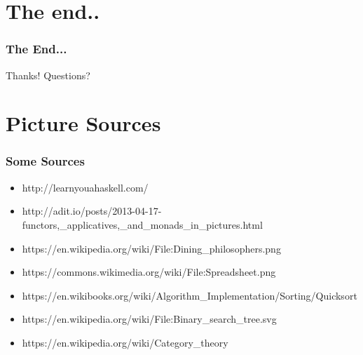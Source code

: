 \documentclass[12pt, xcolor=table]{beamer}
\begin{document}
\section{The end..} %
\begin{frame}
    \frametitle{The End...}
    \begin{block}{Thanks!}
        Questions?
    \end{block}
\end{frame}

\section{Picture Sources}
\begin{frame}
    \frametitle{Some Sources}
    \begin{itemize}
        \item \tiny{http://learnyouahaskell.com/}
        \item \tiny{http://adit.io/posts/2013-04-17-functors,\_applicatives,\_and\_monads\_in\_pictures.html}
        \item \tiny{https://en.wikipedia.org/wiki/File:Dining\_philosophers.png}
        \item \tiny{https://commons.wikimedia.org/wiki/File:Spreadsheet.png}
        \item \tiny{https://en.wikibooks.org/wiki/Algorithm\_Implementation/Sorting/Quicksort}
        \item \tiny{https://en.wikipedia.org/wiki/File:Binary\_search\_tree.svg}
        \item \tiny{https://en.wikipedia.org/wiki/Category\_theory}
    \end{itemize}
\end{frame}
\end{document}
